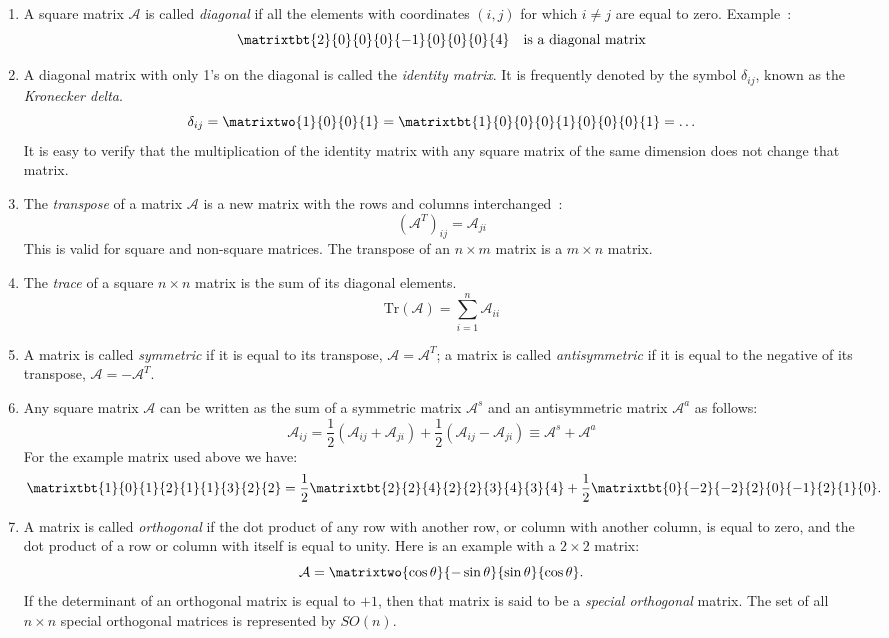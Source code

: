 \begin{enumerate}
\item A square matrix $\mathcal{A}$ is called \textit{diagonal} if all the elements with coordinates $(i,j)$ for which $i\neq j$ are equal to zero. 
Example~:
\[
\matrixtbt{2}{0}{0}{0}{-1}{0}{0}{0}{4}\quad\mbox{is a diagonal matrix}
\]

\item A diagonal matrix with only 1's on the diagonal is called the \textit{identity matrix}.  It is frequently denoted by the symbol $\delta_{ij}$, known as the \textit{Kronecker delta}.
\[
\delta_{ij}=\matrixtwo{1}{0}{0}{1}=\matrixtbt{1}{0}{0}{0}{1}{0}{0}{0}{1}=\ldots
\]
It is easy to verify that the multiplication of the identity matrix with any square matrix of the same dimension does not change that matrix.

\item The \textit{transpose} of a matrix $\mathcal{A}$ is a new matrix with the rows and columns interchanged~:
\[
\left(\mathcal{A}^{T}\right)_{ij}=\mathcal{A}_{ji}
\]
This is valid for square and non-square matrices.  The transpose of an $n\times m$ matrix is a $m\times n$ matrix.

\item The \textit{trace} of a square $n\times n$ matrix is the sum of its diagonal elements.
\[
\text{Tr}(\mathcal{A})=\sum_{i=1}^{n}\mathcal{A}_{ii}
\]

\item A matrix is called \textit{symmetric} if it is equal to its transpose, $\mathcal{A}=\mathcal{A}^T$; a matrix is called \textit{antisymmetric} if it is equal to the negative of its transpose, $\mathcal{A}=-\mathcal{A}^T$.

\item Any square matrix $\mathcal{A}$ can be written as the sum of a symmetric matrix $\mathcal{A}^s$ and an antisymmetric matrix $\mathcal{A}^a$ as follows:
\[
	\mathcal{A}_{ij} = \frac{1}{2}\left(\mathcal{A}_{ij}+\mathcal{A}_{ji}\right) + \frac{1}{2}\left(\mathcal{A}_{ij}-\mathcal{A}_{ji}\right) \equiv \mathcal{A}^s + \mathcal{A}^a 
\]
For the example matrix used above we have:
\[
	\matrixtbt{1}{0}{1}{2}{1}{1}{3}{2}{2} = \frac{1}{2}\matrixtbt{2}{2}{4}{2}{2}{3}{4}{3}{4}+\frac{1}{2}\matrixtbt{0}{-2}{-2}{2}{0}{-1}{2}{1}{0}.
\]

\item A matrix is called \textit{orthogonal} if the dot product of any row with another row, or column with another column, is equal to zero, and the dot product of a row or column with itself is equal to unity.  
Here is an example with a $2\times 2$ matrix:
\[
	\mathcal{A}=\matrixtwo{\cos\theta}{-\sin\theta}{\sin\theta}{\cos\theta}.
\]
If the determinant of an orthogonal matrix is equal to $+1$, then that matrix is said to be a \textit{special orthogonal} matrix. The set of all $n\times n$ special orthogonal matrices is represented by $SO(n)$.
\end{enumerate} 

